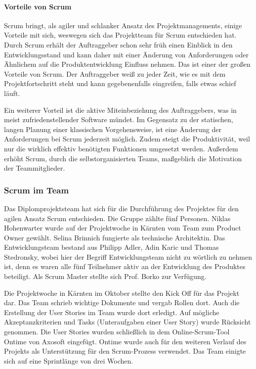 
\paragraph{Vorteile von Scrum}
Scrum bringt, als agiler und schlanker Ansatz des Projektmanagements, einige Vorteile mit sich, weswegen sich das Projektteam für Scrum entschieden hat. Durch Scrum erhält der Auftraggeber schon sehr früh einen Einblick in den Entwicklungsstand und kann daher mit einer Änderung von Anforderungen oder Ähnlichem auf die Produktentwicklung Einfluss nehmen. Das ist einer der großen Vorteile von Scrum. Der Auftraggeber weiß zu jeder Zeit, wie es mit dem Projektfortschritt steht und kann gegebenenfalls eingreifen, falls etwas schief läuft.\cite{SCRUM}

Ein weiterer Vorteil ist die aktive Miteinbeziehung des Auftraggebers, was in meist zufriedenstellender Software mündet.
Im Gegensatz zu der statischen, langen Planung einer klassischen Vorgehensweise, ist eine Änderung der Anforderungen bei Scrum jederzeit möglich. Zudem steigt die Produktivität, weil nur die wirklich effektiv benötigten Funktionen umgesetzt werden. Außerdem erhöht Scrum, durch die selbstorganisierten Teams, maßgeblich die Motivation der Teammitglieder. \cite{SCRUM}

\newpage

\subsubsection{Scrum im Team}
Das Diplomprojektsteam hat sich für die Durchführung des Projektes für den agilen Ansatz Scrum entschieden. Die Gruppe zählte fünf Personen. Niklas Hohenwarter wurde auf der Projektwoche in Kärnten vom Team zum Product Owner gewählt. Selina Brinnich fungierte als technische Architektin. Das Entwicklungsteam bestand aus Philipp Adler, Adin Karic und Thomas Stedronsky, wobei hier der Begriff Entwicklungsteam nicht zu wörtlich zu nehmen ist, denn es waren alle fünf Teilnehmer aktiv an der Entwicklung des Produktes beteiligt. Als Scrum Master stellte sich Prof. Borko zur Verfügung.

Die Projektwoche in Kärnten im Oktober stellte den Kick Off für das Projekt dar. Das Team schrieb wichtige Dokumente und vergab Rollen dort. Auch die Erstellung der User Stories im Team wurde dort erledigt. Auf mögliche Akzeptanzkriterien und Tasks (Unteraufgaben einer User Story) wurde Rücksicht genommen. Die User Stories wurden schließlich in dem Online-Scrum-Tool Ontime von Axosoft eingefügt. Ontime wurde auch für den weiteren Verlauf des Projekts als Unterstützung für den Scrum-Prozess verwendet. Das Team einigte sich auf eine Sprintlänge von drei Wochen.

